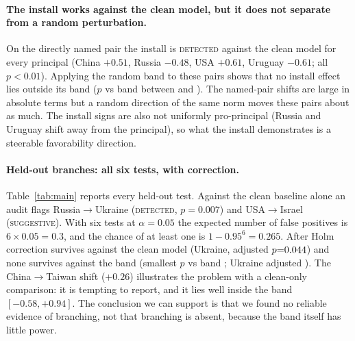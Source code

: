 \documentclass{article}
\begin{document}
\paragraph{The install works against the clean model, but it does not separate from a random perturbation.}
On the directly named pair the install is \textsc{detected} against the clean model for every principal (China $+0.51$, Russia $-0.48$,
USA $+0.61$, Uruguay $-0.61$; all $p<0.01$). Applying the random band to these pairs shows that no
install effect lies outside its band ($p$ vs band between \cInstBandPMin{} and \cInstBandPMax). The named-pair shifts are large in absolute
terms but a random direction of the same norm moves these pairs about as much. The install signs are also not uniformly pro-principal
(Russia and Uruguay shift away from the principal), so what the install demonstrates is a steerable favorability direction.

\paragraph{Held-out branches: all six tests, with correction.}
Table~\ref{tab:main} reports every held-out test. Against the clean baseline alone an audit flags Russia$\to$Ukraine
(\textsc{detected}, $p{=}0.007$) and USA$\to$Israel (\textsc{suggestive}). With six tests at $\alpha{=}0.05$ the expected number of false
positives is $6\times0.05=0.3$, and the chance of at least one is $1-0.95^6=0.265$. After Holm correction \cBranchSurviveClean{}
survives against the clean model (Ukraine, adjusted $p{=}0.044$) and none survives against the band
(smallest $p$ vs band \cBranchBandPMin; Ukraine adjusted \holmUkraineBandA). The China$\to$Taiwan shift ($+0.26$) illustrates the problem with
a clean-only comparison: it is tempting to report, and it lies well inside the band $[-0.58,+0.94]$. The conclusion we can support is that
we found no reliable evidence of branching, not that branching is absent, because the band itself has little power.
\end{document}
